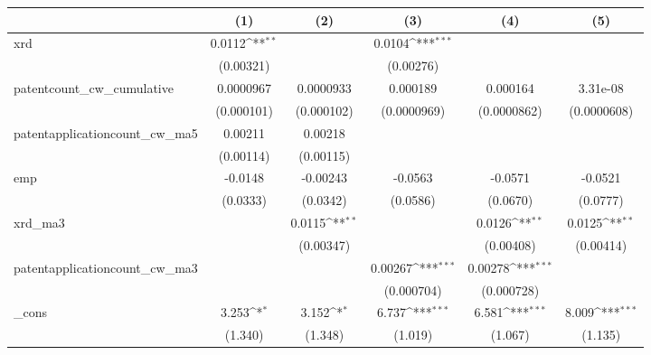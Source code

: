 {
\def\sym#1{\ifmmode^{#1}\else\(^{#1}\)\fi}
\begin{tabular}{l*{5}{c}}
\hline\hline
            &\multicolumn{1}{c}{(1)}         &\multicolumn{1}{c}{(2)}         &\multicolumn{1}{c}{(3)}         &\multicolumn{1}{c}{(4)}         &\multicolumn{1}{c}{(5)}         \\
\hline
xrd         &      0.0112\sym{**} &                     &      0.0104\sym{***}&                     &                     \\
            &   (0.00321)         &                     &   (0.00276)         &                     &                     \\
[1em]
patentcount\_cw\_cumulative&   0.0000967         &   0.0000933         &    0.000189         &    0.000164         &    3.31e-08         \\
            &  (0.000101)         &  (0.000102)         & (0.0000969)         & (0.0000862)         & (0.0000608)         \\
[1em]
patentapplicationcount\_cw\_ma5&     0.00211         &     0.00218         &                     &                     &                     \\
            &   (0.00114)         &   (0.00115)         &                     &                     &                     \\
[1em]
emp         &     -0.0148         &    -0.00243         &     -0.0563         &     -0.0571         &     -0.0521         \\
            &    (0.0333)         &    (0.0342)         &    (0.0586)         &    (0.0670)         &    (0.0777)         \\
[1em]
xrd\_ma3     &                     &      0.0115\sym{**} &                     &      0.0126\sym{**} &      0.0125\sym{**} \\
            &                     &   (0.00347)         &                     &   (0.00408)         &   (0.00414)         \\
[1em]
patentapplicationcount\_cw\_ma3&                     &                     &     0.00267\sym{***}&     0.00278\sym{***}&                     \\
            &                     &                     &  (0.000704)         &  (0.000728)         &                     \\
[1em]
\_cons      &       3.253\sym{*}  &       3.152\sym{*}  &       6.737\sym{***}&       6.581\sym{***}&       8.009\sym{***}\\
            &     (1.340)         &     (1.348)         &     (1.019)         &     (1.067)         &     (1.135)         \\

\end{tabular}}
